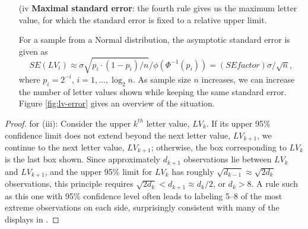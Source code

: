 \documentclass[12pt,oneside]{article}
\begin{document}
\begin{enumerate}
\item[(iv]{\bf Maximal standard error}:
the fourth rule gives us the maximum letter value, for which the standard error is fixed to a relative upper limit. 

For a sample from a Normal distribution, the asymptotic standard error is given as 
\begin{equation}
SE(LV_i) \approx \sigma \sqrt{p_i \cdot (1 - p_i)/ n} / \phi(\Phi^{-1}(p_i)) 
 = (SEfactor) \sigma / \sqrt{n},
\label{SELV}
\end{equation}
where $p_i = 2^{-i}$, $i = 1, ..., \log_2n$.
As sample size $n$ increases, we can increase the number of letter values shown while keeping the same standard error. Figure \ref{fig:lv-error} gives an overview of  the situation.





\end{enumerate}





\begin{proof} for (iii):
Consider the upper $k^{th}$ letter value, $LV_k$. If its upper 95\% confidence limit does not extend beyond the next letter value, $LV_{k+1}$, we continue to the next letter value, $LV_{k+1}$; otherwise, the box corresponding to $LV_k$ is the last box shown. Since approximately $d_{k+1}$ observations lie between $LV_k$ and $LV_{k+1}$, and the upper 95\% limit for $LV_k$ has roughly $\sqrt{d_{k-1}} \approx \sqrt{2 d_k }$ observations, this principle requires $\sqrt{2 d_k} < d_{k+1} \approx d_k / 2$, or $d_k > 8$. A rule such as this one with 95\% confidence level often leads to labeling 5--8 of the most extreme observations on each side, surprisingly consistent with many of the displays in \citet{eda}.
\end{proof}
\end{document}
